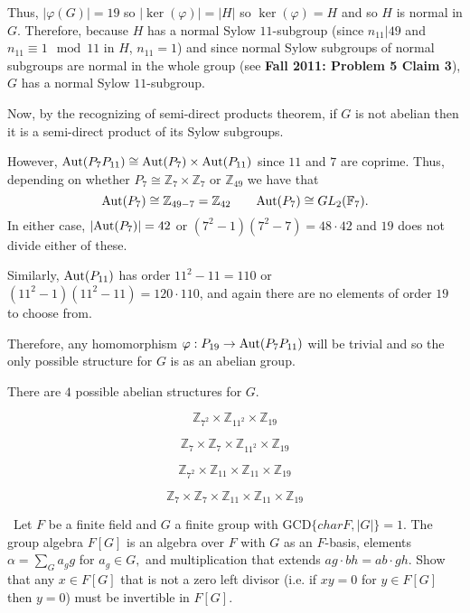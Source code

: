 \documentclass[12pt]{AlgebraQual}
\begin{document}
\begin{solution}
Thus, $|\varphi(G)|=19$ so $|\ker(\varphi)|=|H|$ so $\ker(\varphi)=H$ and so $H$ is normal in $G$. Therefore, because $H$ has a normal Sylow $11$-subgroup (since $n_{11}|49$ and $n_{11}\equiv 1\mod 11$ in $H$, $n_{11}=1$) and since normal Sylow subgroups of normal subgroups are normal in the whole group (see \textbf{Fall 2011: Problem 5 Claim 3}), $G$ has a normal Sylow $11$-subgroup.

Now, by the recognizing of semi-direct products theorem, if $G$ is not abelian then it is a semi-direct product of its Sylow subgroups.

However, $\text{Aut}(P_7P_{11})\cong\text{Aut}(P_7)\times\text{Aut}(P_{11})$ since $11$ and $7$ are coprime. Thus, depending on whether $P_7\cong\mathbb{Z}_7\times\mathbb{Z}_7$ or $\mathbb{Z}_{49}$ we have that $$\text{Aut}(P_7)\cong\mathbb{Z}_{49-7}=\mathbb{Z}_{42}\qquad \text{Aut}(P_7)\cong GL_2(\mathbb{F}_7).$$ In either case, $|\text{Aut}(P_7)|=42$ or $(7^2-1)(7^2-7)=48\cdot 42$ and $19$ does not divide either of these.

Similarly, $\text{Aut}(P_{11})$ has order $11^2-11=110$ or $(11^2-1)(11^2-11)=120\cdot 110$, and again there are no elements of order $19$ to choose from.

Therefore, any homomorphism $\varphi:P_{19}\to\text{Aut}(P_7P_{11})$ will be trivial and so the only possible structure for $G$ is as an abelian group.

There are $4$ possible abelian structures for $G$.

\begin{center}
    \begin{framed}
    $$\mathbb{Z}_{7^2}\times\mathbb{Z}_{11^2}\times\mathbb{Z}_{19}$$

    $$\mathbb{Z}_7\times\mathbb{Z}_7\times\mathbb{Z}_{11^2}\times\mathbb{Z}_{19}$$

    $$\mathbb{Z}_{7^2}\times\mathbb{Z}_{11}\times \mathbb{Z}_{11}\times\mathbb{Z}_{19}$$

    $$\mathbb{Z}_7\times\mathbb{Z}_7\times\mathbb{Z}_{11}\times \mathbb{Z}_{11}\times\mathbb{Z}_{19}$$
    \end{framed}
\end{center}



\end{solution}
\newpage



\begin{problem} $\,$
Let $F$ be a finite field and $G$ a finite group with GCD$\{char F,|G|\}=1$. The group algebra $F[G]$ is an algebra over $F$ with $G$ as an $F$-basis, elements $\alpha=\sum_Ga_gg$ for $a_g\in G,$ and multiplication that extends $ag\cdot bh=ab\cdot gh$. Show that any $x\in F[G]$ that is not a zero left divisor (i.e. if $xy=0$ for $y\in F[G]$ then $y=0$) must be invertible in $F[G].$
\end{problem}
\end{document}
